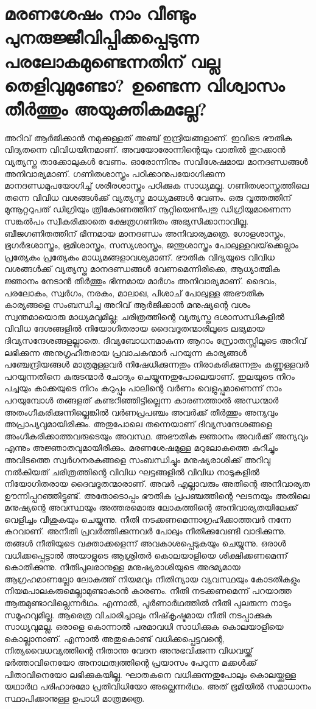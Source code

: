  \section{മരണശേഷം നാം വീണ്ടും പുനരുജ്ജീവിപ്പിക്കപ്പെടുന്ന പരലോകമുണ്ടെന്നതിന് വല്ല തെളിവുമുണ്ടോ? ഉണ്ടെന്ന വിശ്വാസം തീര്‍ത്തും അയുക്തികമല്ലേ?}
 അറിവ് ആര്‍ജിക്കാന്‍ നമുക്കുള്ളത് അഞ്ച് ഇന്ദ്രിയങ്ങളാണ്. ഇവിടെ ഭൗതിക വിദ്യതന്നെ വിവിധയിനമാണ്. അവയോരോന്നിന്റെയും വാതില്‍ തുറക്കാന്‍ വ്യത്യസ്ത താക്കോലുകള്‍ വേണം. ഓരോന്നിനും സവിശേഷമായ മാനദണ്ഡങ്ങള്‍ അനിവാര്യമാണ്. ഗണിതശാസ്ത്രം പഠിക്കാനുപയോഗിക്കുന്ന മാനദണ്ഡമുപയോഗിച്ച് ശരീരശാസ്ത്രം പഠിക്കുക സാധ്യമല്ല. ഗണിതശാസ്ത്രത്തിലെ തന്നെ വിവിധ വശങ്ങള്‍ക്ക് വ്യത്യസ്ത മാധ്യമങ്ങള്‍ വേണം. ഒരു വൃത്തത്തിന് മുന്നൂറ്ററുപത് ഡിഗ്രിയും ത്രികോണത്തിന് നൂറ്റിയെണ്‍പതു ഡിഗ്രിയുമാണെന്ന സങ്കല്‍പം സ്വീകരിക്കാതെ ക്ഷേത്രഗണിതം അഭ്യസിക്കാനാവില്ല. ബീജഗണിതത്തിന് ഭിന്നമായ മാനദണ്ഡം അനിവാര്യമത്രെ. ഗോളശാസ്ത്രം, ഭൂഗര്‍ഭശാസ്ത്രം, ഭൂമിശാസ്ത്രം, സസ്യശാസ്ത്രം, ജന്തുശാസ്ത്രം പോലുള്ളവയ്‌ക്കെല്ലാം പ്രത്യേകം പ്രത്യേകം മാധ്യമങ്ങളാവശ്യമാണ്.
ഭൗതിക വിദ്യയുടെ വിവിധ വശങ്ങള്‍ക്ക് വ്യത്യസ്ത മാനദണ്ഡങ്ങള്‍ വേണമെന്നിരിക്കെ, ആധ്യാത്മിക ജ്ഞാനം നേടാന്‍ തീര്‍ത്തും ഭിന്നമായ മാര്‍ഗം അനിവാര്യമാണ്. ദൈവം, പരലോകം, സ്വര്‍ഗം, നരകം, മാലാഖ, പിശാച് പോലുള്ള അഭൗതിക കാര്യങ്ങളെ സംബന്ധിച്ച അറിവ് ആര്‍ജിക്കാന്‍ മനുഷ്യന്റെ വശം സ്വന്തമായൊരു മാധ്യമവുമില്ല; ചരിത്രത്തിന്റെ വ്യത്യസ്ത ദശാസന്ധികളില്‍ വിവിധ ദേശങ്ങളില്‍ നിയോഗിതരായ ദൈവദൂതന്മാരിലൂടെ ലഭ്യമായ ദിവ്യസന്ദേശങ്ങളല്ലാതെ. ദിവ്യബോധനമാകുന്ന ആറാം സ്രോതസ്സിലൂടെ അറിവ് ലഭിക്കുന്ന അനുഗൃഹീതരായ പ്രവാചകന്മാര്‍ പറയുന്ന കാര്യങ്ങള്‍ പഞ്ചേന്ദ്രിയങ്ങള്‍ മാത്രമുള്ളവര്‍ നിഷേധിക്കുന്നതും നിരാകരിക്കുന്നതും കണ്ണുള്ളവര്‍ പറയുന്നതിനെ കുരുടന്മാര്‍ ചോദ്യം ചെയ്യുന്നതുപോലെയാണ്. ഇലയുടെ നിറം പച്ചയും കാക്കയുടെ നിറം കറുപ്പും പാലിന്റെ വര്‍ണം വെളുപ്പുമാണെന്ന് നാം പറയുമ്പോള്‍ തങ്ങളത് കണ്ടറിഞ്ഞിട്ടില്ലെന്ന കാരണത്താല്‍ അന്ധന്മാര്‍ അതംഗീകരിക്കുന്നില്ലെങ്കില്‍ വര്‍ണപ്രപഞ്ചം അവര്‍ക്ക് തീര്‍ത്തും അന്യവും അപ്രാപ്യവുമായിരിക്കും. അതുപോലെ തന്നെയാണ് ദിവ്യസന്ദേശങ്ങളെ അംഗീകരിക്കാത്തവരുടെയും അവസ്ഥ. അഭൗതിക ജ്ഞാനം അവര്‍ക്ക് അന്യവും എന്നും അജ്ഞാതവുമായിരിക്കും.
മരണശേഷമുള്ള മറുലോകത്തെ കുറിച്ചും അവിടത്തെ സ്വര്‍ഗനരകങ്ങളെ സംബന്ധിച്ചും മനുഷ്യരാശിക്ക് അറിവു നല്‍കിയത് ചരിത്രത്തിന്റെ വിവിധ ഘട്ടങ്ങളില്‍ വിവിധ നാടുകളില്‍ നിയോഗിതരായ ദൈവദൂതന്മാരാണ്. അവര്‍ എല്ലാവരും അതിന്റെ അനിവാര്യത ഊന്നിപ്പറഞ്ഞിട്ടുണ്ട്. അതോടൊപ്പം ഭൗതിക പ്രപഞ്ചത്തിന്റെ ഘടനയും അതിലെ മനുഷ്യന്റെ അവസ്ഥയും അത്തരമൊരു ലോകത്തിന്റെ അനിവാര്യതയിലേക്ക് വെളിച്ചം വീശുകയും ചെയ്യുന്നു.
നീതി നടക്കണമെന്നാഗ്രഹിക്കാത്തവര്‍ നന്നേ കുറവാണ്. അനീതി പ്രവര്‍ത്തിക്കുന്നവര്‍ പോലും നീതിക്കുവേണ്ടി വാദിക്കുന്നു. തങ്ങള്‍ നീതിയുടെ വക്താക്കളെന്ന് അവകാശപ്പെടുകയും ചെയ്യുന്നു. ഒരാള്‍ വധിക്കപ്പെട്ടാല്‍ അയാളുടെ ആശ്രിതര്‍ കൊലയാളിയെ ശിക്ഷിക്കണമെന്ന് കൊതിക്കുന്നു. നീതിപുലരാനുള്ള മനുഷ്യരാശിയുടെ അദമ്യമായ ആഗ്രഹമാണല്ലോ ലോകത്ത് നിയമവും നീതിന്യായ വ്യവസ്ഥയും കോടതികളും നിയമപാലകരുമെല്ലാമുണ്ടാകാന്‍ കാരണം. നീതി നടക്കണമെന്ന് പറയാത്ത ആരുമുണ്ടാവില്ലെന്നര്‍ഥം. എന്നാല്‍, പൂര്‍ണാര്‍ഥത്തില്‍ നീതി പുലരുന്ന നാടും സമൂഹവുമില്ല. ആരെത്ര വിചാരിച്ചാലും നിഷ്‌കൃഷ്ടമായ നീതി നടപ്പാക്കുക സാധ്യവുമല്ല. ഒരാളെ കൊന്നാല്‍ പരമാവധി സാധിക്കുക കൊലയാളിയെ കൊല്ലാനാണ്. എന്നാല്‍ അതുകൊണ്ട് വധിക്കപ്പെട്ടവന്റെ, നിത്യവൈധവ്യത്തിന്റെ നിതാന്ത വേദന അനുഭവിക്കുന്ന വിധവയ്ക്ക് ഭര്‍ത്താവിനെയോ അനാഥത്വത്തിന്റെ പ്രയാസം പേറുന്ന മക്കള്‍ക്ക് പിതാവിനെയോ ലഭിക്കുകയില്ല. ഘാതകനെ വധിക്കുന്നതുപോലും കൊലയ്ക്കുള്ള യഥാര്‍ഥ പരിഹാരമോ പ്രതിവിധിയോ അല്ലെന്നര്‍ഥം. അത് ഭൂമിയില്‍ സമാധാനം സ്ഥാപിക്കാനുള്ള ഉപാധി മാത്രമത്രെ.
